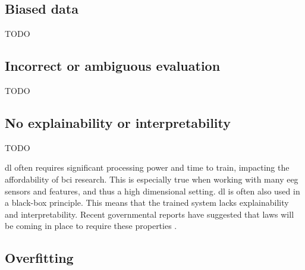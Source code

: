 \subsection{Biased data}
\label{subsec:processing_signals_common_issues_bias}

TODO


\subsection{Incorrect or ambiguous evaluation}
\label{subsec:processing_signals_common_issues_generalisation}

TODO


\subsection{No explainability or interpretability}
\label{subsec:processing_signals_common_issues_exaplainable}

TODO

\Gls{dl} often requires significant processing power and time to train, impacting the affordability of \gls{bci} research.
This is especially true when working with many \gls{eeg} sensors and features, and thus a high dimensional setting. 
\Gls{dl} is often also used in a black-box principle.
This means that the trained system lacks explainability and interpretability.
Recent governmental reports have suggested that laws will be coming in place to require these properties \citep{eu_ai_blackbox_report, explainable_ai_policy}.


\subsection{Overfitting}
\label{subsec:processing_signals_common_issues_overfitting}


